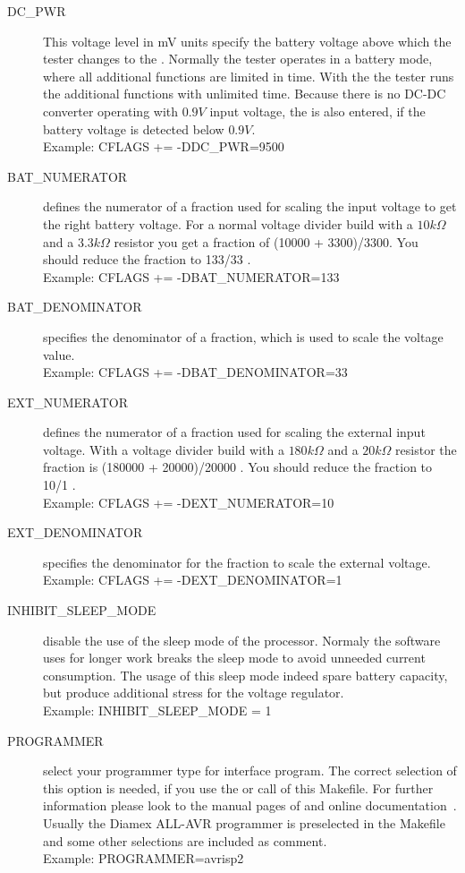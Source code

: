 \begin{description}
  \item[DC\_PWR] This voltage level in mV units specify the battery voltage above which the tester
  changes to the . Normally the tester operates in a battery mode, where all additional
functions are limited in time. With the  the tester runs the additional functions with unlimited time.
Because there is no DC-DC converter operating with \(0.9V\) input voltage,
the  is also entered, if the battery voltage is detected below \(0.9V\). \\
Example: CFLAGS += -DDC\_PWR=9500

 \item[BAT\_NUMERATOR] defines the numerator of a fraction used for scaling the input voltage to get the right
battery voltage.
For a normal voltage divider build with a \(10 k\Omega\) and a \(3.3 k\Omega\) resistor you get a fraction 
of (10000 + 3300)/3300. 
You should reduce the fraction to 133/33 .\\
Example: CFLAGS += -DBAT\_NUMERATOR=133

 \item[BAT\_DENOMINATOR] specifies the denominator of a fraction, which is used to scale the voltage value.\\
Example: CFLAGS += -DBAT\_DENOMINATOR=33

 \item[EXT\_NUMERATOR] defines the numerator of a fraction used for scaling the external input voltage.
 With a voltage divider build with a \(180 k\Omega\) and a \(20 k\Omega\) resistor the fraction is (180000 + 20000)/20000 .
You should reduce the fraction to 10/1 .\\
Example: CFLAGS += -DEXT\_NUMERATOR=10

 \item[EXT\_DENOMINATOR] specifies the denominator for the fraction to scale the external voltage. \\
Example: CFLAGS += -DEXT\_DENOMINATOR=1

  \item[INHIBIT\_SLEEP\_MODE] disable the use of the sleep mode of the processor.
Normaly the software uses for longer work breaks the sleep mode to avoid unneeded current consumption.
The usage of this sleep mode indeed spare battery capacity, but produce additional stress for the voltage regulator.\\
Example: INHIBIT\_SLEEP\_MODE = 1

\label{sec:config-Prog}
  \item[PROGRAMMER] select your programmer type for  interface program.
  The correct selection of this option is needed, if you use the  or  call
of this Makefile.
For further information please look to the manual pages of  and online documentation~\cite{avrdude}.
Usually the Diamex ALL-AVR programmer is preselected in the Makefile and some
other selections are included as comment.\\
Example: PROGRAMMER=avrisp2


\end{description}
